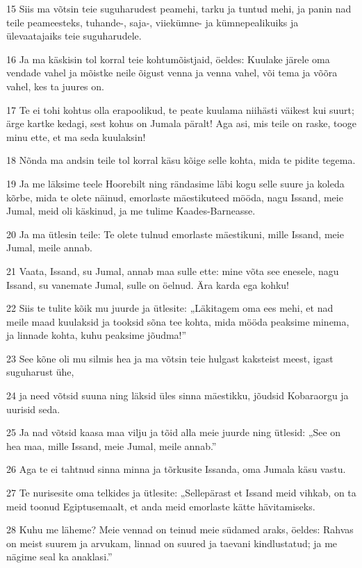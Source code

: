 \par 15 Siis ma võtsin teie suguharudest peamehi, tarku ja tuntud mehi, ja panin nad teile peameesteks, tuhande-, saja-, viiekümne- ja kümnepealikuiks ja ülevaatajaiks teie suguharudele.
\par 16 Ja ma käskisin tol korral teie kohtumõistjaid, öeldes: Kuulake järele oma vendade vahel ja mõistke neile õigust venna ja venna vahel, või tema ja võõra vahel, kes ta juures on.
\par 17 Te ei tohi kohtus olla erapoolikud, te peate kuulama niihästi väikest kui suurt; ärge kartke kedagi, sest kohus on Jumala päralt! Aga asi, mis teile on raske, tooge minu ette, et ma seda kuulaksin!
\par 18 Nõnda ma andsin teile tol korral käsu kõige selle kohta, mida te pidite tegema.
\par 19 Ja me läksime teele Hoorebilt ning rändasime läbi kogu selle suure ja koleda kõrbe, mida te olete näinud, emorlaste mäestikuteed mööda, nagu Issand, meie Jumal, meid oli käskinud, ja me tulime Kaades-Barneasse.
\par 20 Ja ma ütlesin teile: Te olete tulnud emorlaste mäestikuni, mille Issand, meie Jumal, meile annab.
\par 21 Vaata, Issand, su Jumal, annab maa sulle ette: mine võta see enesele, nagu Issand, su vanemate Jumal, sulle on öelnud. Ära karda ega kohku!
\par 22 Siis te tulite kõik mu juurde ja ütlesite: „Läkitagem oma ees mehi, et nad meile maad kuulaksid ja tooksid sõna tee kohta, mida mööda peaksime minema, ja linnade kohta, kuhu peaksime jõudma!”
\par 23 See kõne oli mu silmis hea ja ma võtsin teie hulgast kaksteist meest, igast suguharust ühe,
\par 24 ja need võtsid suuna ning läksid üles sinna mäestikku, jõudsid Kobaraorgu ja uurisid seda.
\par 25 Ja nad võtsid kaasa maa vilju ja tõid alla meie juurde ning ütlesid: „See on hea maa, mille Issand, meie Jumal, meile annab.”
\par 26 Aga te ei tahtnud sinna minna ja tõrkusite Issanda, oma Jumala käsu vastu.
\par 27 Te nurisesite oma telkides ja ütlesite: „Sellepärast et Issand meid vihkab, on ta meid toonud Egiptusemaalt, et anda meid emorlaste kätte hävitamiseks.
\par 28 Kuhu me läheme? Meie vennad on teinud meie südamed araks, öeldes: Rahvas on meist suurem ja arvukam, linnad on suured ja taevani kindlustatud; ja me nägime seal ka anaklasi.”
